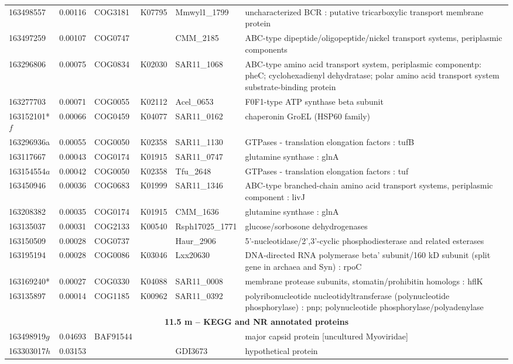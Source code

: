 \begin{landscape}
\begin{longtable}{p{1.8cm}p{0.9cm}p{2.2cm}p{1cm}p{2.8cm}p{13.4cm}}
163498557&0.00116&COG3181&K07795&Mmwyl1\_1799&uncharacterized BCR : putative tricarboxylic transport membrane protein \\
163497259&0.00107&COG0747&&CMM\_2185&ABC-type dipeptide/oligopeptide/nickel transport systems, periplasmic components \\
163296806&0.00075&COG0834&K02030&SAR11\_1068&ABC-type amino acid transport system, periplasmic componentp: pheC; cyclohexadienyl dehydratase; polar amino acid transport system substrate-binding protein \\
163277703&0.00071&COG0055&K02112&Acel\_0653&F0F1-type ATP synthase beta subunit \\
163152101*$f$&0.00066&COG0459&K04077&SAR11\_0162&chaperonin GroEL (HSP60 family) \\
163296936a&0.00055&COG0050&K02358&SAR11\_1130&GTPases - translation elongation factors : tufB \\
163117667&0.00043&COG0174&K01915&SAR11\_0747&glutamine synthase : glnA \\
163154554$a$&0.00042&COG0050&K02358&Tfu\_2648&GTPases - translation elongation factors : tuf \\
163450946&0.00036&COG0683&K01999&SAR11\_1346&ABC-type branched-chain amino acid transport systems, periplasmic component : livJ \\
163208382&0.00035&COG0174&K01915&CMM\_1636&glutamine synthase : glnA \\
163135037&0.00031&COG2133&K00540&Rsph17025\_1771&glucose/sorbosone dehydrogenases \\
163150509&0.00028&COG0737&&Haur\_2906&5'-nucleotidase/2',3'-cyclic phosphodiesterase and related esterases \\
163195194&0.00028&COG0086&K03046&Lxx20630&DNA-directed RNA polymerase beta' subunit/160 kD subunit (split gene in archaea and Syn) : rpoC \\
163169240*&0.00027&COG0330&K04088&SAR11\_0008&membrane protease subunits, stomatin/prohibitin homologs : hflK \\
163135897&0.00014&COG1185&K00962&SAR11\_0392&polyribonucleotide nucleotidyltransferase (polynucleotide phosphorylase) : pnp; polynucleotide phosphorylase/polyadenylase \\
\toprule
\multicolumn{6}{c}{\textbf{11.5 m -- \acs{KEGG} and \acs{NR} annotated proteins}} \\
\midrule
163498919$g$&0.04693&BAF91544&&&major capsid protein [uncultured Myoviridae] \\
163303017$h$&0.03153&&&GDI3673&hypothetical protein \\

\end{longtable}
\end{landscape}
